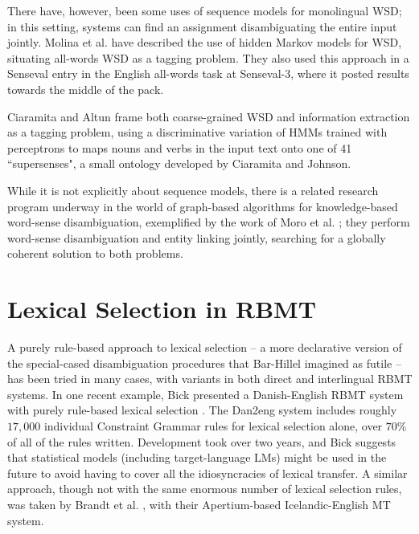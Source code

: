 There have, however, been some uses of sequence models for monolingual WSD; in
this setting, systems can find an assignment disambiguating the entire input
jointly.  Molina et al. \cite{DBLP:conf/iberamia/MolinaPS02} have described the
use of hidden Markov models for WSD, situating all-words WSD as a tagging
problem.  They also used this approach in a Senseval entry
\cite{molina-pla-segarra:2004:Senseval-3} in the English all-words task at
Senseval-3, where it posted results towards the middle of the pack.

Ciaramita and Altun \cite{ciaramita-altun:2006:EMNLP} frame both coarse-grained
WSD and information extraction as a tagging problem, using a discriminative
variation of HMMs trained with perceptrons \cite{collins:2002:EMNLP02}
to maps nouns and verbs in the input text onto one of 41 ``supersenses", a
small ontology developed by Ciaramita and Johnson.

While it is not explicitly about sequence models, there is a related research
program underway in the world of graph-based algorithms for knowledge-based
word-sense disambiguation, exemplified by the work of Moro et al.
\cite{DBLP:journals/tacl/0001RN14}; they perform word-sense disambiguation and
entity linking jointly, searching for a globally coherent solution to both
problems.

\section{Lexical Selection in RBMT}
A purely rule-based approach to lexical selection -- a more declarative version
of the special-cased disambiguation procedures that Bar-Hillel imagined as
futile -- has been tried in many cases, with variants in both direct and
interlingual RBMT systems.
In one recent example, Bick presented a Danish-English RBMT system with purely
rule-based lexical selection \cite{bickdan2eng}. The Dan2eng system includes
roughly $17,000$ individual Constraint Grammar rules for lexical selection
alone, over $70\%$ of all of the rules written. Development took over two
years, and Bick suggests that statistical models (including target-language
LMs) might be used in the future to avoid having to cover all the
idiosyncracies of lexical transfer.
A similar approach, though not with the same enormous number of lexical
selection rules, was taken by Brandt et al. \cite{brandt2011apertium}, with
their Apertium-based Icelandic-English MT system.

